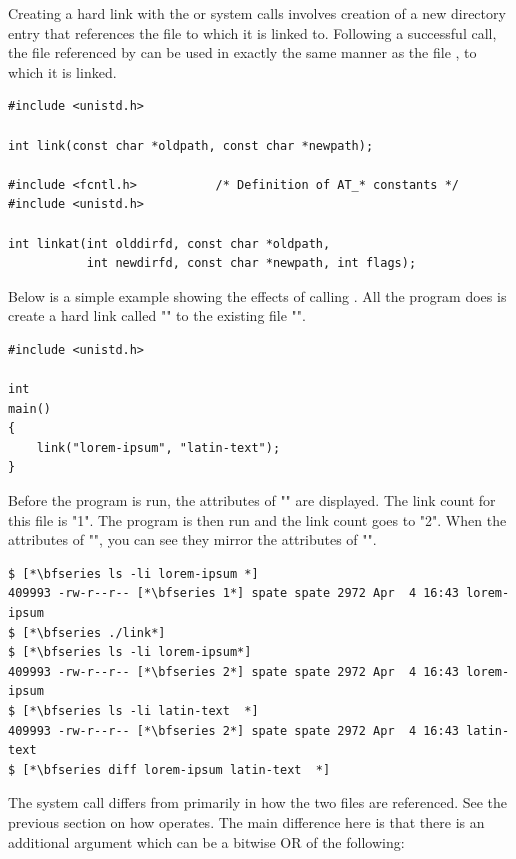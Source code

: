 Creating a hard link with the  or  system calls involves creation of a new directory entry that references the file to which it is linked to. Following a successful call, the file referenced by  can be used in exactly the same manner as the file , to which it is linked.

\begin{lstlisting}
#include <unistd.h>

int link(const char *oldpath, const char *newpath);

#include <fcntl.h>           /* Definition of AT_* constants */ 
#include <unistd.h>

int linkat(int olddirfd, const char *oldpath,
           int newdirfd, const char *newpath, int flags);
\end{lstlisting}

\noindent
Below is a simple example showing the effects of calling . All the program does is create a hard link called "" to the existing file "".

\begin{lstlisting}
#include <unistd.h>

int
main()
{
    link("lorem-ipsum", "latin-text");
}
\end{lstlisting}

\noindent
Before the program is run, the attributes of "" are displayed. The link count for this file is "1". The program is then run and the link count goes to "2". When the attributes of "", you can see they mirror the attributes of "".

\begin{lstlisting}
$ [*\bfseries ls -li lorem-ipsum *]
409993 -rw-r--r-- [*\bfseries 1*] spate spate 2972 Apr  4 16:43 lorem-ipsum
$ [*\bfseries ./link*]
$ [*\bfseries ls -li lorem-ipsum*] 
409993 -rw-r--r-- [*\bfseries 2*] spate spate 2972 Apr  4 16:43 lorem-ipsum
$ [*\bfseries ls -li latin-text  *]
409993 -rw-r--r-- [*\bfseries 2*] spate spate 2972 Apr  4 16:43 latin-text
$ [*\bfseries diff lorem-ipsum latin-text  *]
\end{lstlisting}

\noindent
The  system call differs from  primarily in how the two files are referenced. See the previous section on how  operates. The main difference here is that there is an additional  argument which can be a bitwise OR of the following:

